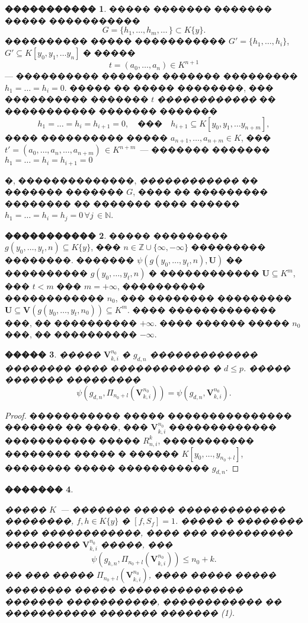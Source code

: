 \documentclass[16pt]{article}
\theoremstyle{plain}
\newtheorem{theorem}{�������}
\newtheorem{lemma}[theorem]{�����}
\theoremstyle{definition}
\newtheorem{definition}[theorem]{�����������}
\theoremstyle{remark}
\begin{document}
\begin{definition}
����� ������� ������� ����� �����������
$$
G=\{h_1,\ldots,h_m,\ldots\,\}\subset K\{y\}.
$$
���������� ����� ����������� $G'=\{h_1,\ldots,h_i\}$, $G'\subseteq K[y_0,y_1,\ldots
y_n]$ � �����
$$
t=(a_0,\ldots,a_n)\in K^{n+1}
$$
--- ���������� ������� ������� ��������� $h_1=\ldots=h_i=0$. ����� �� ����� ��������, ��� ���������� �������
$t$ {\it ������������} �� ����������� ������� �������
$$
h_1=\ldots=h_i=h_{i+1}=0, \quad\mbox{���}\quad h_{i+1}\subseteq K[y_0,y_1,\ldots
y_{n+m}],
$$
���� ���������� ����� $a_{n+1},\ldots, a_{n+m}\in K$, ���
$t'=(a_0,\ldots,a_n,\ldots,a_{n+m})\,\in K^{n+m}$~--- �������
������� $h_1=\ldots=h_i=h_{i+1}=0$

�, ��������������, {\it ������������} �� ������� ������� $G$, ����
�� ��������� �������� �� ������� ���� ������ $h_1=\ldots=h_i=h_{j}=0\, \forall j\,\in \mathbb{N}$.
\end{definition}



\begin{definition}
����� ��������� $g(y_0,\ldots,y_t,n)\subseteq K\{y\}$, ��� $n\in \mathbb{Z}\cup\{\infty,-\infty\}$ ��������� ��������. ������� $\psi(g(y_0,\ldots,y_t,n),\mathbf{U})$ �� ���������� $g(y_0,\ldots,y_t,n)$ �  ������������ $\mathbf{U}\subseteq K^m$, ��� $t< m$ ��� $m=+\infty$, ���������� ������������ $n_0$, ��� �������� ��������� $\mathbf{U}\subseteq \mathbf{V}(g(y_0,\ldots,y_t,n_0))\subseteq K^m$. ���� ������������� ���, �� ���������� $+\infty$. ���� ������ �����  $n_0$ ���, �� ���������� $-\infty$.
\end{definition}

\begin{lemma}\label{lemma:o_ravenste_psi}
����� $\mathbf{V}_{k,i}^{n_0}$ � $g_{d,n}$ ������������� �������� ���� ������������ �  $d\leqslant p$. ����� ������� ��������� $$\psi(g_{d,n},\Pi_{n_0+l}(\mathbf{V}_{k,i}^{n_0}))=\psi(g_{d,n},\mathbf{V}_{k,i}^{n_0}).$$
\end{lemma}

\begin{proof}
����������� ����� ��������������� ������� �� ����, ��� $\mathbf{V}_{k,i}^{n_0}$ ������������� ����������� ����� $R_{n,i}^k$, ����������� �������� ����� � ������ $K[y_0,\ldots,y_{n_0+l}]$, �������� ����� ����������� $g_{d,n}$.
\end{proof}


\begin{theorem}\label{theorem:general th1}

����� $K$~--- ������� ����� ������������� ��������, $f,h\in K\{y\}$ � $[f,S_f]=1$. ����� � �������� ���� ������������, ���� ��� ���������� ��������� $\mathbf{V}_{k,i}^{n_0}$ �����, ���
\begin{equation}
\psi(g_{k,n},\Pi_{n_0+l}(\mathbf{V}_{k,i}^{n_0}))\leqslant n_0+k.
\end{equation}
�� ��� ����� $\Pi_{n_0+l}(\mathbf{V}_{k,i}^{n_0})$, ���� ����� ����� �������� ����� ��������������� ������� �����������, ������������ �� ����������� ������� ������� (1).
\end{theorem}
\end{document}

